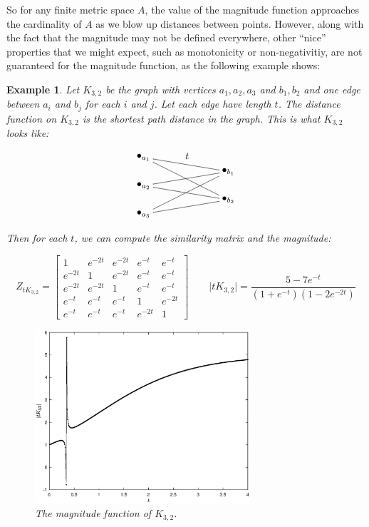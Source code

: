 \documentclass[11pt]{article}
\theoremstyle{mythm}
\newtheorem{ex}[defn]{Example}
\begin{document}
So for any finite metric space $A$, the value of the magnitude function approaches the cardinality of $A$ as we blow up distances between points. However, along with the fact that the magnitude may not be defined everywhere, other ``nice'' properties that we might expect, such as monotonicity or non-negativitiy, are not guaranteed for the magnitude function, as the following example shows:

\begin{ex}
Let $K_{3,2}$ be the graph with vertices $a_1,a_2,a_3$ and $b_1,b_2$ and one edge between $a_i$ and $b_j$ for each $i$ and $j$. Let each edge have length $t$. The distance function on $K_{3,2}$ is the shortest path distance in the graph. This is what $K_{3,2}$ looks like:

\begin{equation*}
\begin{xy}
(0,0)*+{\bullet_{a_1}}="a1";
(0,-10)*+{\bullet_{a_2}}="a2";
(0,-20)*+{\bullet_{a_3}}="a3";
(30,-5)*+{\bullet_{b_1}}="b1";
(30,-15)*+{\bullet_{b_2}}="b2";
{\ar@{-} "a1";"b1"}?*!/_3mm/{t};
{\ar@{-} "a2";"b1"};
{\ar@{-} "a3";"b1"};
{\ar@{-} "a1";"b2"};
{\ar@{-} "a2";"b2"};
{\ar@{-} "a3";"b2"};
\end{xy}
\end{equation*}

Then for each $t$, we can compute the similarity matrix and the magnitude:

\begin{equation*}
Z_{tK_{3,2}} = \begin{bmatrix} 1 & e^{-2t} & e^{-2t} & e^{-t} & e^{-t} \\
e^{-2t} & 1 & e^{-2t} & e^{-t} & e^{-t} \\
e^{-2t} & e^{-2t} & 1 & e^{-t} & e^{-t} \\
e^{-t} & e^{-t} & e^{-t} & 1 & e^{-2t} \\
e^{-t} & e^{-t} & e^{-t} & e^{-2t} & 1
\end{bmatrix} \qquad
\vert tK_{3,2} \vert = \frac{5-7e^{-t}}{(1+e^{-t})(1-2e^{-2t})}
\end{equation*}

\begin{figure}[h!]
\centerline{
\includegraphics[width=8cm]{K32.eps}}\caption{\label{fig:K32}The magnitude function of $K_{3,2}$.}
\end{figure}


\end{ex}
\end{document}
